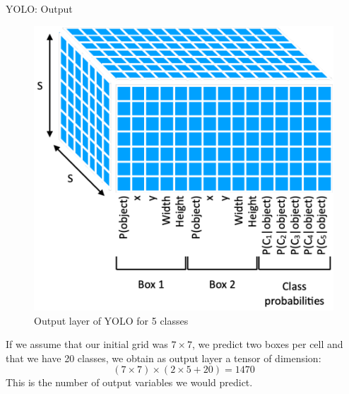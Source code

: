 \documentclass[xcolor=pdftex,dvipsnames,table]{beamer}
\begin{document}
\begin{frame}{YOLO: Output}
\begin{figure}[htb]
   \centering
   \includegraphics[height=0.4\textheight]{../graphics/YOLO_Output.pdf}
   \caption{Output layer of YOLO for 5 classes}
\end{figure}
If we assume that our initial grid was $7 \times 7$, we predict two boxes per cell and that we have 20 classes, we obtain as output layer a tensor of dimension: 
\begin{equation}\nonumber
(7 \times 7) \times (2 \times 5 + 20) = 1470
\end{equation}
This is the number of output variables we would predict. 
\end{frame}
\end{document}
